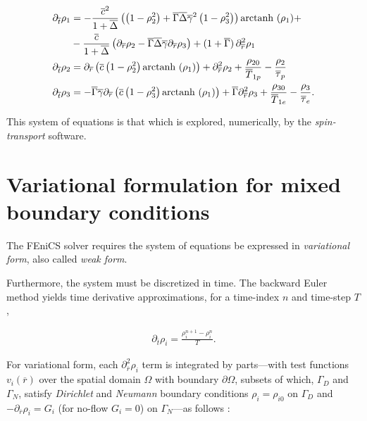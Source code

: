 \documentclass[%
oneside,                 %
final,                   %
10pt]{article}
\begin{document}
\begin{align} 
	\partial_{\overline{t}} \rho_1 
	&=
	-\frac{\overline{c}^2}{1+\overline{\Delta}}
	\left(
		\left(
			1 - \rho_2^2
		\right)
		+
		\overline{\Gamma}\overline{\Delta}\overline{\gamma}^2
		\left(
			1 - \rho_3^2
		\right)
	\right)
	\text{arctanh }(\rho_1) + 
	\nonumber\\
	&-\frac{\overline{c}}{1+\overline{\Delta}}
	\left(
		\partial_{\overline{r}} \rho_2 - \overline{\Gamma}\overline{\Delta}\overline{\gamma} \partial_{\overline{r}} \rho_3
	\right)
	+ ( 1 + \overline{\Gamma} )\, \partial_{\overline{r}}^2 \rho_1
	\label{eq:btransport1b} \\
	\partial_{\overline{t}} \rho_2 
	&=
	\partial_{\overline{r}}
	\left(
		\overline{c}
		\left( 1 - \rho_2^2 \right)
		\text{arctanh }(\rho_1)
	\right)
	+ \partial_{\overline{r}}^2 \rho_2
	+ \frac{\rho_{20}}{\overline{T}_{1p}} 
	- \frac{\rho_2}{\overline{\tau}_p}
	\label{eq:btransport2b} \\
	\partial_{\overline{t}} \rho_3
	&=
	- 
	\overline{\Gamma}\overline{\gamma}
	\partial_{\overline{r}}
	\left(
		\overline{c}
		\left( 1 - \rho_3^2 \right)
		\text{arctanh }(\rho_1)
	\right)
	+ \overline{\Gamma} \partial_{\overline{r}}^2 \rho_3
	+ \frac{\rho_{30}}{\overline{T}_{1e}} 
	- \frac{\rho_3}{\overline{\tau}_e} .
	\label{eq:btransport3b}
\end{align}

This system of equations is that which is explored, numerically, by the \emph{spin-transport} software.

\section{Variational formulation for mixed boundary conditions}
\label{variational_form}

The FEniCS solver requires the system of equations be expressed in \emph{variational form}, also called \emph{weak form}.

Furthermore, the system must be discretized in time. The backward Euler method yields time derivative approximations, for a time-index $n$ and time-step $T$,

\begin{align}
	\partial_{\overline{t}} \rho_i = 
	\frac{\rho_i^{n+1} - \rho_i^n}{T}.
\end{align}

For variational form, each $\partial_{\overline{r}}^2 \rho_i$ term is integrated by parts---with test functions $v_i(\overline{r})$ over the spatial domain $\Omega$ with boundary $\partial\Omega$, subsets of which, $\Gamma_D$ and $\Gamma_N$, satisfy \emph{Dirichlet} and \emph{Neumann} boundary conditions $\rho_i = \rho_{i0}$ on $\Gamma_D$ and $-\partial_{\overline{r}} \rho_i = G_i$ (for no-flow $G_i = 0$) on $\Gamma_N$---as follows \cite[\S~4.1.1--4.1.2]{Langtangen2017}:
\end{document}

